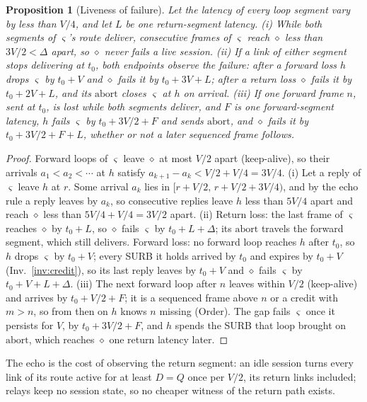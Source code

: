 \documentclass[journal]{IEEEtran}
\newtheorem{proposition}{Proposition}
\newcommand{\cl}{\diamond}
\newcommand{\sid}{\varsigma}
\begin{document}
\begin{proposition}[Liveness of failure]\label{prop:liveness}
Let the latency of every loop segment vary by less than $V/4$, and let $L$
be one return-segment latency.  (i) While both segments of $\sid$'s route
deliver, consecutive frames of $\sid$ reach $\cl$ less than $3V/2<\Delta$
apart, so $\cl$ never fails a live session.  (ii) If a link of either
segment stops delivering at $t_0$, both endpoints observe the failure:
after a forward loss $h$ drops $\sid$ by $t_0+V$ and $\cl$ fails it by
$t_0+3V+L$; after a return loss $\cl$ fails it by $t_0+2V+L$, and its
$\mathrm{abort}$ closes $\sid$ at $h$ on arrival.  (iii) If one forward frame
$n$, sent at $t_0$, is lost while both segments deliver, and $F$ is one
forward-segment latency, $h$ fails $\sid$ by $t_0+3V/2+F$ and sends
$\mathrm{abort}$, and $\cl$ fails it by $t_0+3V/2+F+L$, whether or not a
later sequenced frame follows.
\end{proposition}
\begin{proof}
Forward loops of $\sid$ leave $\cl$ at most $V/2$ apart (keep-alive), so
their arrivals $a_1<a_2<\cdots$ at $h$ satisfy $a_{k+1}-a_k<V/2+V/4=3V/4$.
(i) Let a reply of $\sid$ leave $h$ at $r$.  Some arrival $a_k$ lies in
$[r+V/2,\,r+V/2+3V/4)$, and by the echo rule a reply leaves by $a_k$, so
consecutive replies leave $h$ less than $5V/4$ apart and reach $\cl$ less
than $5V/4+V/4=3V/2$ apart.  (ii) Return loss: the last frame of $\sid$ reaches $\cl$ by
$t_0+L$, so $\cl$ fails $\sid$ by $t_0+L+\Delta$; its $\mathrm{abort}$
travels the forward segment, which still delivers.  Forward loss: no
forward loop reaches $h$ after $t_0$, so $h$ drops $\sid$ by $t_0+V$;
every SURB it holds arrived by $t_0$ and expires by $t_0+V$
(Inv.~\ref{inv:credit}), so its last reply leaves by $t_0+V$ and $\cl$
fails $\sid$ by $t_0+V+L+\Delta$.  (iii) The next forward loop after $n$
leaves within $V/2$ (keep-alive) and arrives by $t_0+V/2+F$; it is a
sequenced frame above $n$ or a credit with $m>n$, so from then on $h$
knows $n$ missing (Order).  The gap fails $\sid$ once it persists for $V$,
by $t_0+3V/2+F$, and $h$ spends the SURB that loop brought on
$\mathrm{abort}$, which reaches $\cl$ one return latency later.
\end{proof}

The echo is the cost of observing the return segment: an idle session
turns every link of its route active for at least $D=Q$ once per $V/2$,
its return links included; relays keep no session state, so no cheaper witness
of the return path exists.
\end{document}
